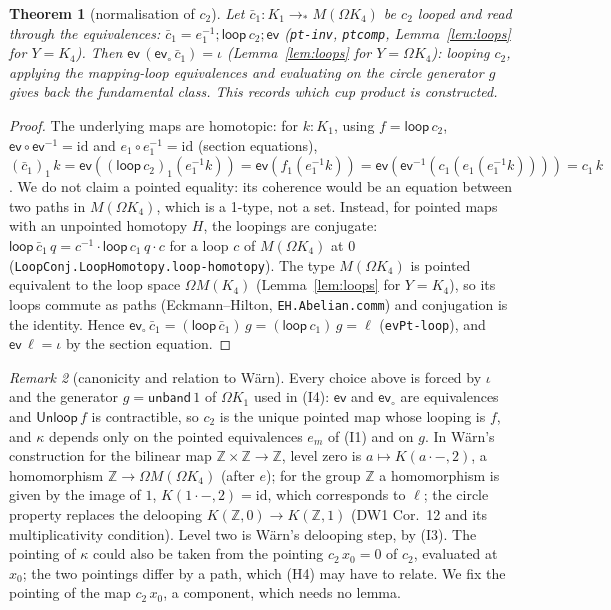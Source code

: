 \documentclass[11pt]{amsart}
\newtheorem{theorem}{Theorem}
\theoremstyle{definition}
\theoremstyle{remark}
\newtheorem{remark}[theorem]{Remark}
\newcommand{\Om}{\Omega}
\newcommand{\Z}{\mathbb{Z}}
\newcommand{\code}[1]{\texttt{#1}}
\newcommand{\cc}{\cdot}
\newcommand{\ev}{\mathsf{ev}}
\newcommand{\lp}{\mathsf{loop}}
\begin{document}
\begin{theorem}[normalisation of $c_2$]\label{t:norm}
Let $\bar c_1:K_1\to_*M(\Om K_4)$ be $c_2$ looped and read through the
equivalences: $\bar c_1=e_1^{-1};\lp\,c_2;\ev$ (\code{pt-inv}, \code{ptcomp},
Lemma~\ref{lem:loops} for $Y=K_4$). Then $\ev\,(\ev_\circ\,\bar c_1)=\iota$
(Lemma~\ref{lem:loops} for $Y=\Om K_4$): looping $c_2$, applying the
mapping-loop equivalences and evaluating on the circle generator $g$ gives
back the fundamental class. This records which cup product is constructed.
\end{theorem}
\begin{proof}
The underlying maps are homotopic: for $k:K_1$, using $f=\lp\,c_2$,
$\ev\circ\ev^{-1}=\mathrm{id}$ and $e_1\circ e_1^{-1}=\mathrm{id}$ (section
equations),
$(\bar c_1)_1\,k=\ev((\lp\,c_2)_1(e_1^{-1}k))=\ev(f_1(e_1^{-1}k))
=\ev(\ev^{-1}(c_{1}(e_1(e_1^{-1}k))))=c_1\,k$. We do not claim a pointed
equality: its coherence would be an equation between two paths in
$M(\Om K_4)$, which is a 1-type, not a set. Instead, for pointed maps with
an unpointed homotopy $H$, the loopings are conjugate:
$\lp\,\bar c_1\,q=c^{-1}\cc\lp\,c_1\,q\cc c$ for a loop $c$ of $M(\Om K_4)$
at $0$ (\code{LoopConj.LoopHomotopy.loop-homotopy}). The type $M(\Om K_4)$
is pointed equivalent to the loop space $\Om M(K_4)$
(Lemma~\ref{lem:loops} for $Y=K_4$), so its loops commute as paths
(Eckmann--Hilton, \code{EH.Abelian.comm}) and conjugation is the identity.
Hence $\ev_\circ\,\bar c_1=(\lp\,\bar c_1)\,g=(\lp\,c_1)\,g=\ell$
(\code{evPt-loop}), and $\ev\,\ell=\iota$ by the section equation.
\end{proof}

\begin{remark}[canonicity and relation to Wärn]\label{r:canon}
Every choice above is forced by $\iota$ and the generator
$g=\mathsf{unband}\,1$ of $\Om K_1$ used in (I4): $\ev$ and $\ev_\circ$ are
equivalences and $\mathsf{Unloop}\,f$ is contractible, so $c_2$ is the
unique pointed map whose looping is $f$, and $\kappa$ depends only on the
pointed equivalences $e_m$ of (I1) and on $g$. In Wärn's construction for the
bilinear map $\Z\times\Z\to\Z$, level zero is $a\mapsto K(a\cdot{-},2)$,
a homomorphism $\Z\to\Om M(\Om K_4)$ (after $e$); for the group $\Z$ a
homomorphism is given by the image of $1$, $K(1\cdot{-},2)=\mathrm{id}$,
which corresponds to $\ell$; the circle property replaces the delooping
$K(\Z,0)\to K(\Z,1)$ (DW1 Cor.~12 and its multiplicativity condition).
Level two is Wärn's delooping step, by (I3). The pointing of $\kappa$
could also be taken from the pointing $c_2\,x_0=0$ of $c_2$, evaluated at
$x_0$; the two pointings differ by a path, which (H4) may have to
relate. We fix the pointing of the map $c_2\,x_0$, a component, which
needs no lemma.
\end{remark}
\end{document}
